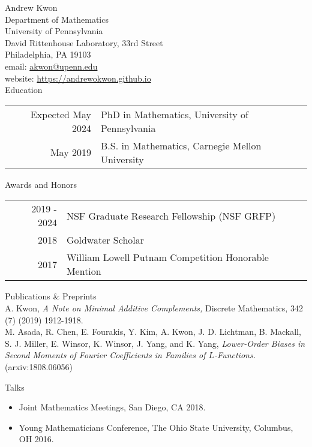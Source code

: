 \documentclass{article}
\begin{document}
\LARGE{Andrew Kwon}\vspace{0.0in}\\

\normalsize
Department of Mathematics\\
University of Pennsylvania\\
David Rittenhouse Laboratory, 33rd Street\\
Philadelphia, PA 19103\\

email: \href{mailto:akwon@upenn.edu}{akwon@upenn.edu}\\
website: \url{https://andrewokwon.github.io}\vspace{0.25in}\\

\Large{Education}\vspace{0.2in}\\
\normalsize
\begin{tabular}{r l}
	Expected May 2024 & PhD in Mathematics, University of Pennsylvania\\
	May 2019 & B.S. in Mathematics, Carnegie Mellon University
\end{tabular}
\vspace{0.25in}

\Large{Awards and Honors}\vspace{0.2in}\\
\normalsize
\begin{tabular}{r l}
	2019 - 2024 & NSF Graduate Research Fellowship (NSF GRFP)\\
	2018 & Goldwater Scholar\\
	2017 & William Lowell Putnam Competition Honorable Mention
\end{tabular}
\vspace{0.25in}

\Large{Publications \& Preprints}\vspace{0.2in}\\
\normalsize
A. Kwon, \textit{A Note on Minimal Additive Complements,} Discrete Mathematics, 342 (7) (2019) 1912-1918.\\

M. Asada, R. Chen, E. Fourakis, Y. Kim, A. Kwon, J. D. Lichtman, B. Mackall, S. J. Miller, E. Winsor, K. Winsor, J. Yang, and K. Yang, \textit{Lower-Order Biases in Second Moments of Fourier Coefficients in Families of $L$-Functions.} (arxiv:1808.06056)

\vspace{0.25in}
\Large{Talks}\\
\normalsize
\begin{itemize}
	\item Joint Mathematics Meetings, San Diego, CA 2018. 
	\item Young Mathematicians Conference, The Ohio State University, Columbus, OH 2016.
\end{itemize}
\end{document}
